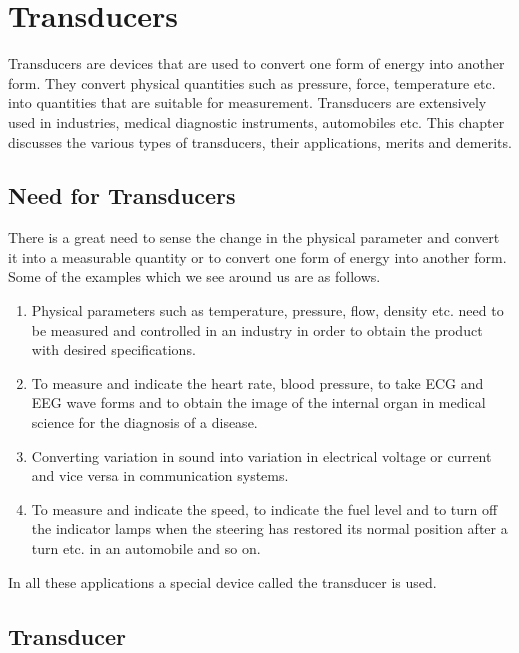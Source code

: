 \chapter{Transducers}\label{chap8}

Transducers are devices that are used to convert one form of energy into another form. They convert physical quantities such as pressure, force, temperature etc. into quantities that are suitable for measurement. Transducers are extensively used in industries, medical diagnostic instruments, automobiles etc. This chapter discusses the various types of transducers, their applications, merits and demerits.

\section{Need for Transducers}\label{sec8.1}

There is a great need to sense the change in the physical parameter and convert it into a measurable quantity or to convert one form of energy into another form. Some of the examples which we see around us are as follows.
\begin{enumerate}
\item Physical parameters such as temperature, pressure, flow, density etc. need to be measured and controlled in an industry in order to obtain the product with desired specifications.

\item To measure and indicate the heart rate, blood pressure, to take ECG and EEG wave forms and to obtain the image of the internal organ in medical science for the diagnosis of a disease.

\item Converting variation in sound into variation in electrical voltage or current and vice versa in communication systems.

\item To measure and indicate the speed, to indicate the fuel level and to turn off the indicator lamps when the steering has restored its normal position after a turn etc. in an automobile and so on. 
\end{enumerate}

In all these applications a special device called the transducer is used.

\section{Transducer}\label{sec8.2}

